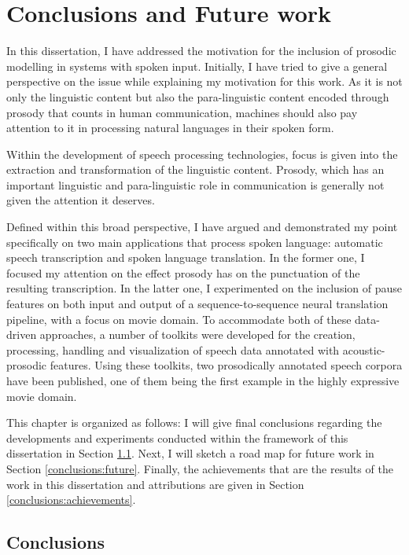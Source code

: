 
\chapter{Conclusions and Future work}
\label{chapter:conclusion}

In this dissertation, I have addressed the motivation for the inclusion of prosodic modelling in systems with spoken input. Initially, I have tried to give a general perspective on the issue while explaining my motivation for this work. As it is not only the linguistic content but also the para-linguistic content encoded through prosody that counts in human communication, machines should also pay attention to it in processing natural languages in their spoken form. 

Within the development of speech processing technologies, focus is given into the extraction and transformation of the linguistic content. Prosody, which has an important linguistic and para-linguistic role in communication is generally not given the attention it deserves. 

Defined within this broad perspective, I have argued and demonstrated my point specifically on two main applications that process spoken language: automatic speech transcription and spoken language translation. In the former one, I focused my attention on the effect prosody has on the punctuation of the resulting transcription. In the latter one, I experimented on the inclusion of pause features on both input and output of a sequence-to-sequence neural translation pipeline, with a focus on movie domain. To accommodate both of these data-driven approaches, a number of toolkits were developed for the creation, processing, handling and visualization of speech data annotated with acoustic-prosodic features. Using these toolkits, two prosodically annotated speech corpora have been published, one of them being the first example in the highly expressive movie domain. 

This chapter is organized as follows: I will give final conclusions regarding the developments and experiments conducted within the framework of this dissertation in Section \ref{conclusions:conclusions}. Next, I will sketch a road map for future work in Section \ref{conclusions:future}. Finally, the achievements that are the results of the work in this dissertation and attributions are given in Section \ref{conclusions:achievements}.

\section{Conclusions}
\label{conclusions:conclusions}

